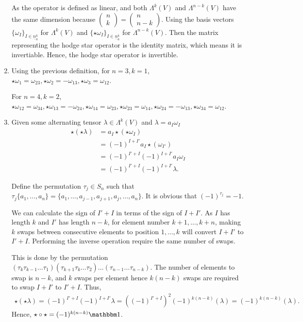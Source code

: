 \documentclass{exam}
\numberwithin{equation}{section}
\begin{document}
\begin{enumerate}[label=\alph*)]
        As the operator is defined as linear, and both \(\Lambda^{k}(V)\) and \(\Lambda^{n-k}(V)\) have the same dimension because \(\begin{pmatrix}
            n\\k
        \end{pmatrix}=\begin{pmatrix}
            n\\n-k
        \end{pmatrix}\).
        Using the basis vectors \(\{\omega_I\}_{I\in\underline{n}_a^k}\) for \(\Lambda^k(V)\) and $\{\star\omega_I\}_{I\in \underline{n}_a^k}$ for \(\Lambda^{n-k}(V)\). Then the matrix representing the hodge star operator is the identity matrix, which means it is invertiable. Hence, the hodge star operator is invertible.

        \item Using the previous definition, for $n=3,k=1$, \(\star\omega_1=\omega_{23},\star\omega_2=-\omega_{13},\star\omega_3=\omega_{12}\). 
        
        For $n=4,k=2$, \(\star\omega_{12}=\omega_{34},\star\omega_{13}=-\omega_{24},\star\omega_{14}=\omega_{23},\star\omega_{23}=\omega_{14},\star\omega_{24}=-\omega_{13},\star\omega_{34}=\omega_{12}\).

        \item Given some alternating tensor \(\lambda\in\Lambda^k(V)\) and \(\lambda=a_I\omega_I\)\begin{align*}
            \star(\star\lambda)&=a_I\star(\star\omega_I)\\
            &=(-1)^{I+I'}a_I\star(\omega_{I'})\\
            &=(-1)^{I'+I}(-1)^{I+I'}a_I\omega_I\\
            &=(-1)^{I'+I}(-1)^{I+I'}\lambda.
        \end{align*}

        Define the permutation \(\tau_j\in S_n\) such that \(\tau_j\{a_1,\dots,a_n\}=\{a_1,\dots,a_{j-1},a_{j+1},a_j,\dots,a_n\}\). It is obvious that \((-1)^{\tau_j}=-1\).

        We can calculate the sign of $I'+I$ in terms of the sign of $I+I'$. As $I$ has length $k$ and $I'$ has length $n-k$, for element number $k+1,\dots,k+n$, making $k$ swaps between consecutive elements to position $1,\dots,k$ will convert $I+I'$ to $I'+I$. Performing the inverse operation require the same number of swaps.

        This is done by the permutation \((\tau_k\tau_{k-1}\dots\tau_1)(\tau_{k+1}\tau_k\dots\tau_2)\dots(\tau_{n-1}\dots\tau_{n-k})\).
        The number of elements to swap is $n-k$, and $k$ swaps per element hence $k(n-k)$ swaps are required to swap $I+I'$ to $I'+I$. Thus,
        \begin{align*}
            \star(\star\lambda)=(-1)^{I'+I}(-1)^{I+I'}\lambda=((-1)^{I'+I})^2(-1)^{k(n-k)}(\lambda)=(-1)^{k(n-k)}(\lambda).
        \end{align*}
        Hence, \(\star\circ\star=(-1)^{k(n-k)}\mathbbm 1\).
    \end{enumerate}
\end{document}
